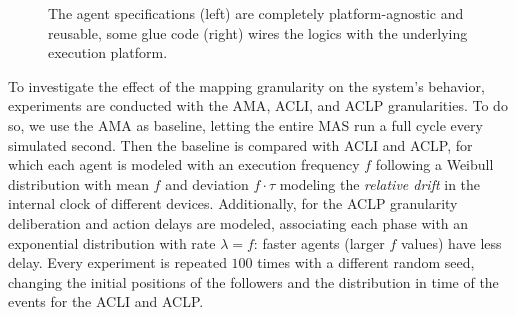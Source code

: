 \begin{figure}
    \begin{minipage}[b]{.6\linewidth}
        \centering
        
    \end{minipage}
    \hfill
    \begin{minipage}[b]{.34\linewidth}
        \centering
        
    \end{minipage}
    \caption{
        The agent specifications (left) are completely platform-agnostic and reusable,
        some glue code (right) wires the logics with the underlying execution platform.
    }
    \label{fig:code}
\end{figure}


To investigate the effect of the mapping granularity on the system's behavior, experiments are conducted with the \ac{AMA}, \ac{ACLI}, and \ac{ACLP} granularities.
%
To do so, we use the \ac{AMA} as baseline,
letting the entire \ac{MAS} run a full cycle every simulated second.
%
Then the baseline is compared with \ac{ACLI} and \ac{ACLP},
for which each agent is modeled with an execution frequency $f$
following a Weibull distribution with mean $f$ and deviation $f\cdot\tau$ modeling the \emph{relative drift} in the internal clock of different devices.
%
Additionally, for the \ac{ACLP} granularity deliberation and action delays are modeled,
associating each phase with an exponential distribution with rate $\lambda = f$:
faster agents (larger $f$ values) have less delay.
%
Every experiment is repeated $100$ times with a different random seed, changing
the initial positions of the followers
and the distribution in time of the events for the \ac{ACLI} and \ac{ACLP}.

